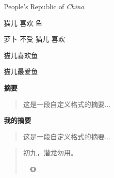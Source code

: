 \documentclass{ctexart}
\newcommand\PRC{People's Republic of \emph{China}}
\newcommand\loves[2]{#1 喜欢 #2}
\newcommand\hatedby[2]{#2 不受 #1 喜欢}
\newcommand\love[3][喜欢]{#2#1#3}
\newenvironment{myabstract}[1][摘要]
    {\small
    \begin{center}\bfseries #1\end{center}
    \begin{quotation}} %
    {\end{quotation}}  %
\newenvironment{Quotation}[1]
    {\newcommand\quotesource{#1}
    \begin{quotation}}
    {\par\hfill---《\textit{\quotesource}》
    \end{quotation}}
\begin{document}
    \PRC

    \loves{猫儿}{鱼}

    \hatedby{猫儿}{萝卜}

    \love{猫儿}{鱼}

    \love[最爱]{猫儿}{鱼}

    \begin{abstract}
        这是一段摘要...
    \end{abstract}

    \begin{myabstract}
        这是一段自定义格式的摘要...
    \end{myabstract}

    \begin{myabstract}[我的摘要]
        这是一段自定义格式的摘要...
    \end{myabstract}

    \begin{Quotation}{易$\cdot$乾}
        初九，潜龙勿用。
    \end{Quotation}
\end{document}
